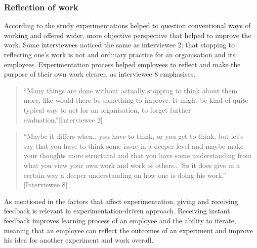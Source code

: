 \subsubsection{Reflection of work}
According to the study experimentations helped to question conventional ways of working and offered wider, more objective perspective that helped to improve the work. Some interviewees noticed the same as interviewee 2; that stopping to reflecting one's work is not and ordinary practice for an organisation and its employees. Experimentation process helped employees to reflect and make the purpose of their own work clearer, as interviewee 8 emphasises. 
\begin{quote}
``Many things are done without actually stopping to think about them more, like would there be something to improve. It might be kind of quite typical way to act for an organisation, to forget further evaluation.''[Interviewee 2]
\end{quote}
\begin{quote}
``Maybe it differs when.. you have to think, or you get to think, but let's say that you have to think some issue in a deeper level and maybe make your thoughts more structural and that you have some understanding from what you view your own work and work of others.. 'So it does give in a certain way a deeper understanding on how one is doing his work.'' [Interviewee 8]
\end{quote}
As mentioned in the factors that affect experimentation, giving and receiving feedback is relevant in experimentation-driven approach. Receiving instant feedback improves learning process of an employee and the ability to iterate, meaning that an employee can reflect the outcomes of an experiment and improve his idea for another experiment and work overall. 


